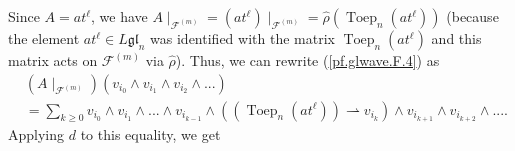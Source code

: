 \documentclass[etingof-lie.tex]{subfiles}
\begin{document}
Since $A=at^{\ell}$, we have $A\mid_{\mathcal{F}^{\left(  m\right)  }}=\left(
at^{\ell}\right)  \mid_{\mathcal{F}^{\left(  m\right)  }}=\widehat{\rho
}\left(  \operatorname*{Toep}\nolimits_{n}\left(  at^{\ell}\right)  \right)  $
(because the element $at^{\ell}\in L\mathfrak{gl}_{n}$ was identified with the
matrix $\operatorname*{Toep}\nolimits_{n}\left(  at^{\ell}\right)  $ and this
matrix acts on $\mathcal{F}^{\left(  m\right)  }$ via $\widehat{\rho}$). Thus,
we can rewrite (\ref{pf.glwave.F.4}) as%
\begin{align}
&  \left(  A\mid_{\mathcal{F}^{\left(  m\right)  }}\right)  \left(  v_{i_{0}%
}\wedge v_{i_{1}}\wedge v_{i_{2}}\wedge...\right) \nonumber\\
&  =\sum\limits_{k\geq0}v_{i_{0}}\wedge v_{i_{1}}\wedge...\wedge v_{i_{k-1}%
}\wedge\left(  \left(  \operatorname*{Toep}\nolimits_{n}\left(  at^{\ell
}\right)  \right)  \rightharpoonup v_{i_{k}}\right)  \wedge v_{i_{k+1}}\wedge
v_{i_{k+2}}\wedge.... \label{pf.glwave.F.4b}%
\end{align}
Applying $d$ to this equality, we get%
\end{document}
